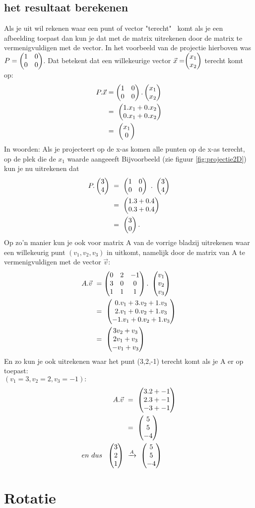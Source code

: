 \documentclass[hidelinks, a4wide, 12pt,  twoside]{book}
\begin{document}
\subsection{het resultaat berekenen}
Als je uit wil rekenen waar een punt of vector "terecht" \ komt als je een afbeelding toepast dan kun je dat met de matrix uitrekenen door de matrix te vermenigvuldigen met de vector. In het voorbeeld van de projectie hierboven was $ P = \begin{pmatrix} 1&0 \\ 0&0 \end{pmatrix} $. Dat betekent dat een willekeurige vector $ \vec{x} =  \vectweesnel{x} $  terecht komt op: 
\begin{align*}
P.\vec{x} 
&= \begin{pmatrix} 1&0 \\ 0&0 \end{pmatrix}   .
\begin{pmatrix} x_1 \\ x_2 \end{pmatrix} \\
&= \ \begin{pmatrix} 1.x_1 + 0.x_2 \\ 0.x_1 + 0.x_2 \end{pmatrix}  \\
& = \ \begin{pmatrix} x_1 \\ 0 \end{pmatrix}  
\end{align*}
In woorden: Als je projecteert op de x-as komen alle punten  op de x-as terecht, op de plek die de $ x_1 $ waarde aangeeeft Bijvoorbeeld (zie figuur \ref{fig:projectie2D}) kun je nu uitrekenen dat
\begin{align*}
P . \mattwee{3}{4}  \ 
&= \ \mattwee{1&0}{0&0}  \ . \   \mattwee{3}{4}  \\
&=  \ \mattwee{1.3 + 0.4}{0.3 + 0.4} \\
&= \ \mattwee{3}{0}.  
\end{align*}
Op zo'n manier kun je ook voor  matrix A van de vorrige bladzij uitrekenen waar een willekeurig punt $ (v_1, v_2, v_3)  $ in \RD uitkomt, namelijk door de matrix van A te vermenigvuldigen met de vector $ \vec{v} $:
\begin{align*}
A.\vec{v} \ 
&= \matdrie{0&2&-1}{3&0&0}{1&1&1}  
. \ \matdrie{v_1}{v_2}{v_3}   \\
&= \ \matdrie{0.v_1 + 3.v_2 + 1.v_3}{2.v_1 + 0.v_2+ 1.v_3}{-1.v_1 + 0.v_2 + 1.v_3}  \\
&= \ \matdrie{3v_2 + v_3}{2v_1 +  v_3}{-v_1 +  v_3} 
\end{align*}
En zo kun je ook  uitrekenen waar het punt (3,2,-1) terecht komt als je A er op toepast: \\
$ (v_1 = 3, v_2 = 2 ,  v_3=-1 ):  $ 
\begin{align*}
\quad \ A.\vec{v} \ 
&= \ \matdrie{3.2 + -1}{2.3+  -1}{-3 +  -1} \\
&= \  \matdrie{5}{5}{-4} \\
en \ dus \ \ 
\matdrie{3}{2}{1}  \ & \xrightarrow{A}  \   \matdrie{5}{5}{-4}
\end{align*}
\section{Rotatie}		
\label{rotatie}
\end{document}
